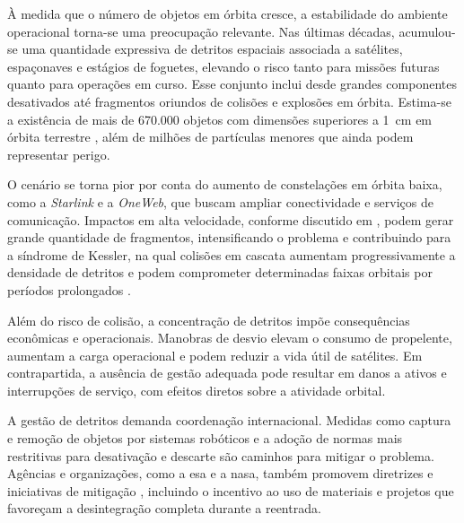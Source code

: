 À medida que o número de objetos em órbita cresce, a estabilidade do ambiente operacional torna-se uma preocupação relevante.
Nas últimas décadas, acumulou-se uma quantidade expressiva de detritos espaciais associada a satélites, espaçonaves e estágios de foguetes, elevando o risco tanto para missões futuras quanto para operações em curso.
Esse conjunto inclui desde grandes componentes desativados até fragmentos oriundos de colisões e explosões em órbita.
Estima-se a existência de mais de 670.000 objetos com dimensões superiores a 1~cm em órbita terrestre \cite{esaSpaceDebris}, além de milhões de partículas menores que ainda podem representar perigo.

O cenário se torna pior por conta do aumento de constelações em órbita baixa, como a \emph{Starlink} e a \emph{OneWeb}, que buscam ampliar conectividade e serviços de comunicação.
Impactos em alta velocidade, conforme discutido em \cite{esaAboutSpaceDebris}, podem gerar grande quantidade de fragmentos, intensificando o problema e contribuindo para a síndrome de Kessler, na qual colisões em cascata aumentam progressivamente a densidade de detritos e podem comprometer determinadas faixas orbitais por períodos prolongados \cite{kessler1978}.

Além do risco de colisão, a concentração de detritos impõe consequências econômicas e operacionais.
Manobras de desvio elevam o consumo de propelente, aumentam a carga operacional e podem reduzir a vida útil de satélites.
Em contrapartida, a ausência de gestão adequada pode resultar em danos a ativos e interrupções de serviço, com efeitos diretos sobre a atividade orbital.

A gestão de detritos demanda coordenação internacional.
Medidas como captura e remoção de objetos por sistemas robóticos e a adoção de normas mais restritivas para desativação e descarte são caminhos para mitigar o problema.
Agências e organizações, como a \gls{esa} e a \gls{nasa}, também promovem diretrizes e iniciativas de mitigação \cite{esaDebrisMitigation2023}, incluindo o incentivo ao uso de materiais e projetos que favoreçam a desintegração completa durante a reentrada.
